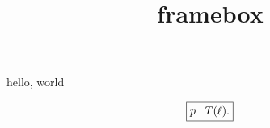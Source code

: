\documentclass{amsart}
\title{framebox}
\begin{document}
\maketitle

hello, world



\[
    \framebox{$p\mid T(\ell)$.}
\]
\end{document}
